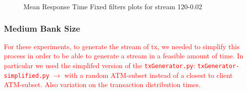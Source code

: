 \begin{figure}[H]
    \centering
    
    \vspace{0.5cm} %


    \caption{Mean Response Time Fixed filters plots for stream 120-0.02}
    \label{img:exps-read-input-variants}
\end{figure}

\subsubsection{Medium Bank Size}
  
\textcolor{red}{For these experiments, to generate the stream of tx, we needed to simplify this process in order to be able to generate a stream in a feasible amount of time. In particular we used the simplifed version of the \texttt{txGenerator.py}: \texttt{txGenerator-simplified.py} $\rightarrow$ with a random ATM-subset instead of a closest to client ATM-subset. Also variation on the transaction distribution times.}
  

